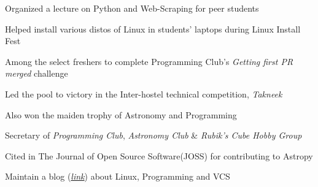 \documentclass[]{deedy-resume-openfont}
\begin{document}
\begin{minipage}[t]{0.69\textwidth}
\vspace{0 mm}
\begin{tightemize}
    \item Organized a lecture on Python and Web-Scraping for peer students
    \item Helped install various distos of Linux in students' laptops during Linux Install Fest
    \item Among the select freshers to complete Programming Club's \textit{Getting first PR merged} challenge 
\end{tightemize}

\begin{tightemize}
    \item Led the pool to victory in the Inter-hostel technical competition, \textit{Takneek}
    \item Also won the maiden trophy of Astronomy and Programming
\end{tightemize}

\begin{tightemize}
    \item Secretary of \textit{Programming Club}, \textit{Astronomy Club} \& \textit{Rubik's Cube Hobby Group}
    \item Cited in The Journal of Open Source Software(JOSS) for contributing to Astropy\textsuperscript{\texttrademark}
    \item Maintain a blog (\textit{\href{http://aniketpandey.com/homepage}{link}}) about Linux, Programming and VCS
\end{tightemize}

\end{minipage} 
\end{document}
